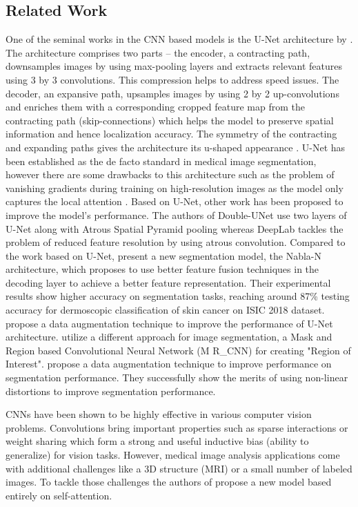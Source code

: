 \subsection{Related Work}
One of the seminal works in the CNN based models is the U-Net architecture by \citep{unet-2015-ronneberger}. The architecture comprises two parts – the encoder, a contracting path, downsamples images by using max-pooling layers and extracts relevant features using 3 by 3 convolutions. This compression helps to address speed issues. The decoder, an expansive path, upsamples images by using 2 by 2 up-convolutions and enriches them with a corresponding cropped feature map from the contracting path (skip-connections) which helps the model to preserve spatial information and hence localization accuracy. The symmetry of the contracting and expanding paths gives the architecture its u-shaped appearance \citep{unet-2015-ronneberger}. U-Net has been established as the de facto standard in medical image segmentation, however there are some drawbacks to this architecture such as  the problem of vanishing gradients during training on high-resolution images as the model only captures the local attention \citep{transformers-2020-dosovitskiy}. Based on U-Net, other work has been proposed to improve the model’s performance. The authors of Double-UNet \citep{double_unet-2020-jha} use two layers of U-Net along with Atrous Spatial Pyramid pooling whereas DeepLab \citep{deeplab-2016-chen} tackles the problem of reduced feature resolution by using atrous convolution. Compared to the work based on U-Net, \citep{nabla-2019-alom} present a new segmentation model, the Nabla-N architecture, which proposes to use better feature fusion techniques in the decoding layer to achieve a better feature representation. Their experimental results show higher accuracy on segmentation tasks, reaching around 87\% testing accuracy for dermoscopic classification of skin cancer on ISIC 2018 dataset. \citep{data_purification-2019-bisla} propose a data augmentation technique to improve the performance of U-Net architecture. \citep{melonama_diagnosis-2021-codella} utilize a different approach for image segmentation, a Mask and Region based Convolutional Neural Network (M R\_CNN) for creating "Region of Interest". \citep{ensambles-2016-codella} propose a data augmentation technique to improve performance on segmentation performance. They successfully show the merits of using non-linear distortions to improve segmentation performance.

\par
CNNs have been shown to be highly effective in various computer vision problems. Convolutions bring important properties such as sparse interactions or weight sharing which form a strong and useful inductive bias (ability to generalize) for vision tasks. However, medical image analysis applications come with additional challenges like a 3D structure (MRI) or a small number of labeled images. To tackle those challenges the authors of \citep{convolution_free-2021-karimi} propose a new model based entirely on self-attention.

